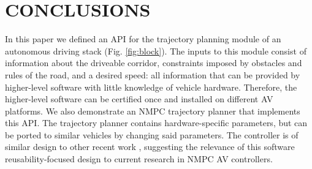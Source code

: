 \documentclass[letterpaper, 10 pt, conference]{ieeeconf}  %
\begin{document}
% 
% 
% 
% 
   
\section{CONCLUSIONS}

In this paper we defined an API for the trajectory planning module of an autonomous driving stack (Fig. \ref{fig:block}). The inputs to this module consist of information about the driveable corridor, constraints imposed by obstacles and rules of the road, and a desired speed: all information that can be provided by higher-level software with little knowledge of vehicle hardware. Therefore, the higher-level software can be certified once and installed on different AV platforms.
We also demonstrate an NMPC trajectory planner that implements this API. The trajectory planner contains hardware-specific parameters, but can be ported to similar vehicles by changing said parameters. The controller is of similar design to other recent work \cite{nmpc_micheli}, suggesting the relevance of this software reusability-focused design to current research in NMPC AV controllers.


\addtolength{\textheight}{-12cm}   %
\end{document}
